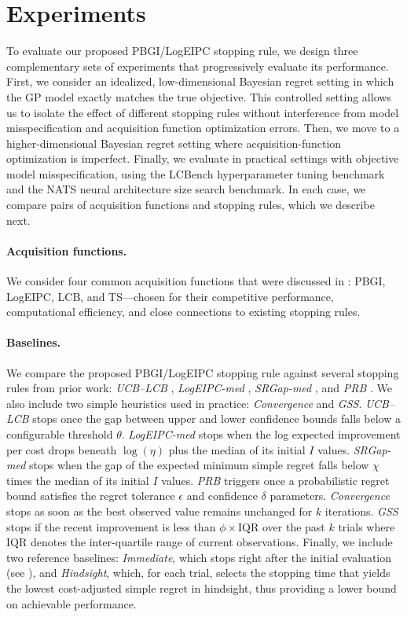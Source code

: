 \section{Experiments}
\label{sec:experiment}
To evaluate our proposed PBGI/LogEIPC stopping rule, we design three complementary sets of experiments that progressively evaluate its performance. 
First, we consider an idealized, low-dimensional Bayesian regret setting in which the GP model exactly matches the true objective. This controlled setting allows us to isolate the effect of different stopping rules without interference from model misspecification and acquisition function optimization errors. 
Then, we move to a higher-dimensional Bayesian regret setting where acquisition-function optimization is imperfect. 
Finally, we evaluate in practical settings with objective model misspecification, using the LCBench hyperparameter tuning benchmark and the NATS neural architecture size search benchmark. 
In each case, we compare pairs of acquisition functions and stopping rules, which we describe next.

\paragraph{Acquisition functions.} We consider four common acquisition functions that were discussed in : PBGI, LogEIPC, LCB, and TS---chosen for their competitive performance, computational efficiency, and close connections to existing stopping rules. 

\paragraph{Baselines.} We compare the proposed PBGI/LogEIPC stopping rule against several stopping rules from prior work: \emph{UCB–LCB}  \citep{makarova2022automatic}, \emph{LogEIPC-med} \citep{ishibashi2023stopping}, \emph{SRGap-med} \citep{ishibashi2023stopping}, and \emph{PRB} \citep{wilson2024stopping}. We also include two simple heuristics used in practice: \emph{Convergence} and \emph{GSS}. 
\emph{UCB–LCB} stops once the gap between upper and lower confidence bounds falls below a configurable threshold $\theta$. \emph{LogEIPC-med} stops when the log expected improvement per cost drops beneath $\log(\eta)$ plus the median of its initial $I$ values. 
\emph{SRGap-med} stops when the gap of the expected minimum simple regret falls below $\chi$ times the median of its initial $I$ values.
\emph{PRB} triggers once a probabilistic regret bound satisfies the regret tolerance $\epsilon$ and confidence $\delta$ parameters. \emph{Convergence} stops as soon as the best observed value remains unchanged for $k$ iterations.
\emph{GSS} stops if the recent improvement is less than $\phi \times \mathrm{IQR}$ over the past $k$ trials where $\mathrm{IQR}$ denotes the inter-quartile range of current observations. 
Finally, we include two reference baselines: \emph{Immediate}, which stops right after the initial evaluation (see ), and \emph{Hindsight}, which, for each trial, selects the stopping time that yields the lowest cost-adjusted simple regret in hindsight, thus providing a lower bound on achievable performance. 

